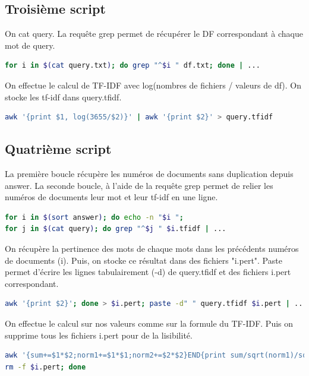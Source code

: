 \documentclass{article}
\begin{document}
\subsection{Troisième script}

On cat query. La requête grep permet de récupérer le DF correspondant à chaque mot de query.

\begin{lstlisting}[language=bash,caption={Requête 1}]
for i in $(cat query.txt); do grep "^$i " df.txt; done | ...
\end{lstlisting}


On effectue le calcul de TF-IDF avec log(nombres de fichiers / valeurs de df). On stocke les tf-idf dans query.tfidf.

\begin{lstlisting}[language=bash,caption={Requête 2}]
awk '{print $1, log(3655/$2)}' | awk '{print $2}' > query.tfidf
\end{lstlisting}

\subsection{Quatrième script}

La première boucle récupère les numéros de documents sans duplication depuis answer.
La seconde boucle, à l'aide de la requête grep permet de relier les numéros de documents leur mot et leur tf-idf en une ligne.

\begin{lstlisting}[language=bash,caption={Requête 1}]
for i in $(sort answer); do echo -n "$i ";
for j in $(cat query); do grep "^$j " $i.tfidf | ...
\end{lstlisting}

On récupère la pertinence des mots de chaque mots dans les précédents numéros de documents (i). Puis, on stocke ce résultat dans des fichiers "i.pert".
Paste permet d'écrire les lignes tabulairement (-d) de query.tfidf et des fichiers i.pert correspondant.

\begin{lstlisting}[language=bash,caption={Requête 2}]
awk '{print $2}'; done > $i.pert; paste -d" " query.tfidf $i.pert | ...
\end{lstlisting}

On effectue le calcul sur nos valeurs comme sur la formule du TF-IDF.
Puis on supprime tous les fichiers i.pert pour de la lisibilité.

\begin{lstlisting}[language=bash,caption={Requête 3}]
awk '{sum+=$1*$2;norm1+=$1*$1;norm2+=$2*$2}END{print sum/sqrt(norm1)/sqrt(norm2)}';
rm -f $i.pert; done
\end{lstlisting}
\end{document}
